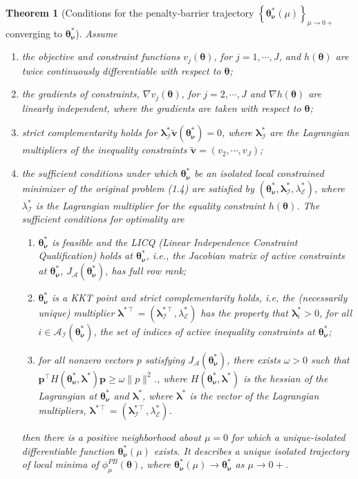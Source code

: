 \documentclass[12pt]{article}
\newcommand{\itl}{\intercal}
\newcommand{\bs}{ \boldsymbol}
\newcommand{\ml}{\mathcal}
\newcommand{\lt}{\left}
\newcommand{\rt}{\right}
\newtheorem{theorem}{Theorem}[section]
\begin{document}
\begin{theorem}[Conditions for the penalty-barrier trajectory $\lt\{ \bs{\theta}_{\bs{\nu}}^*(\mu)\rt\}_{\mu \to 0+}$ converging to $\bs{\theta}_{\bs{\nu}}^*$\cite{Nocedal1999,fiacco,Forsgren2002}]
	Assume
	\begin{enumerate}
		\item the objective and constraint functions $v_j\lt(\bs{\theta}\rt)$, for $j = 1, \cdots, J$, and $h\lt(\bs{\theta}\rt)$ are twice continuously differentiable with respect to $\bs{\theta}$;
		\item the gradients of constraints, $\nabla v_j(\bs{\theta})$, for $j = 2, \cdots, J$ and $\nabla h(\bs{\theta})$ are linearly independent, where the gradients are taken with respect to $\bs{\theta}$;
		\item strict complementarity holds for  $\bs{\lambda}_{\ml{I}}^* \tilde{\bs{v}}(\bs{\theta}_{\bs{\nu}}^*) = 0$, where $\bs{\lambda}_{\ml{I}}^*$ are the Lagrangian multipliers of the inequality constraints $\tilde{\bs{v}} = \lt(v_2, \cdots, v_J\rt)$;
		\item the sufficient conditions under which $\bs{\theta}_{\bs{\nu}}^*$ be an isolated local constrained minimizer of the original problem (1.4) are satisfied by $\lt(\bs{\theta}^*_{\bs{\nu}}, \bs{\lambda}_{\ml{I}}^*, \lambda_{\ml{E}}^*\rt)$, where $\lambda_{\ml{I}}^*$ is the Lagrangian multiplier for the equality constraint $h(\bs{\theta})$. The sufficient conditions for optimality are
		\begin{enumerate}
			\item $\bs{\theta}_{\bs{\nu}}^*$ is feasible and the LICQ (Linear Independence Constraint Qualification) holds at $\bs{\theta}_{\bs{\nu}}^*$, i.e., the Jacobian matrix of active constraints at $\bs{\theta}_{\bs{\nu}}^*$, $J_{\mathcal{A}}(\bs{\theta}_{\bs{\nu}}^*)$, has full row rank;
			\item $\bs{\theta}_{\bs{\nu}}^*$ is a KKT point and strict complementarity holds, i.e, the (necessarily unique) multiplier $\bs{\lambda}^{*\itl} =  \lt(\bs{\lambda}_{\ml{I}}^{*\itl}, \lambda_{\ml{E}}^*\rt)$ has the property that $\bs{\lambda}_i^* > 0$, for all $i  \in \mathcal{A}_{\mathcal{I}}(\bs{\theta}_{\bs{\nu}}^*)$, the set of indices of active inequality constraints at $\bs{\theta}_{\bs{\nu}}^*$;
			\item for all nonzero vectors $p$ satisfying $J_{\mathcal{A}}(\bs{\theta}_{\bs{\nu}}^*)$, there exists $\omega > 0$ such that $\bs{p}^{\itl}H(\bs{\theta}_{\bs{\nu}}^*, \bs{\lambda}^*) \bs{p} \ge \omega \|p\|^2$., where $H(\bs{\theta}_{\bs{\nu}}^*, \bs{\lambda}^*) $ is the hessian of the Lagrangian at $\bs{\theta}_{\bs{\nu}}^*$ and $\bs{\lambda}^*$, where $\bs{\lambda}^*$ is the vector of the Lagrangian multipliers, $\bs{\lambda}^{*\itl} =  \lt(\bs{\lambda}_{\ml{I}}^{*\itl}, \lambda_{\ml{E}}^*\rt)$.
		\end{enumerate} 
		then there is a positive neighborhood about $\mu = 0$ for which a unique-isolated differentiable function $\bs{\theta}^*_{\bs{\nu}}(\mu)$ exists. It describes a unique isolated trajectory of local minima of $\phi_{\mu}^{PB}(\bs{\theta})$, where $\bs{\theta}^*_{\bs{\nu}}(\mu) \to \bs{\theta}^*_{\bs{\nu}}$ as $\mu \to 0+$.
	\end{enumerate}
\end{theorem}
\end{document}
